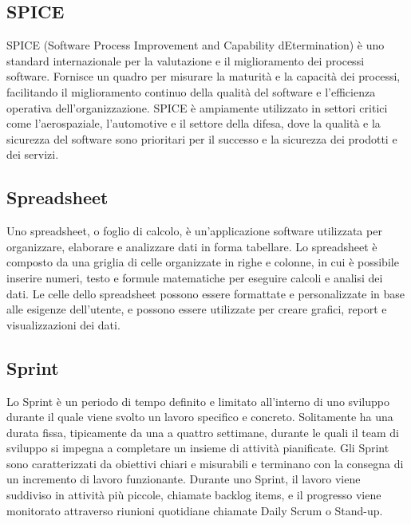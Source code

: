 \vspace{2em}
\subsection*{SPICE}
\par SPICE (Software Process Improvement and Capability dEtermination) è uno standard internazionale per la valutazione e il miglioramento dei processi software. Fornisce un quadro per misurare la maturità e la capacità dei processi, facilitando il miglioramento continuo della qualità del software e l'efficienza operativa dell'organizzazione. SPICE è ampiamente utilizzato in settori critici come l'aerospaziale, l'automotive e il settore della difesa, dove la qualità e la sicurezza del software sono prioritari per il successo e la sicurezza dei prodotti e dei servizi.

\vspace{2em}
\subsection*{Spreadsheet}
\par Uno spreadsheet, o foglio di calcolo, è un'applicazione software utilizzata per organizzare, elaborare e analizzare dati in forma tabellare. Lo spreadsheet è composto da una griglia di celle organizzate in righe e colonne, in cui è possibile inserire numeri, testo e formule matematiche per eseguire calcoli e analisi dei dati. Le celle dello spreadsheet possono essere formattate e personalizzate in base alle esigenze dell'utente, e possono essere utilizzate per creare grafici, report e visualizzazioni dei dati.

\vspace{2em}
\subsection*{Sprint}
\par Lo Sprint è un periodo di tempo definito e limitato all'interno di uno sviluppo  durante il quale viene svolto un lavoro specifico e concreto. Solitamente ha una durata fissa, tipicamente da una a quattro settimane, durante le quali il team di sviluppo si impegna a completare un insieme di attività pianificate. Gli Sprint sono caratterizzati da obiettivi chiari e misurabili e terminano con la consegna di un incremento di lavoro funzionante. Durante uno Sprint, il lavoro viene suddiviso in attività più piccole, chiamate backlog items, e il progresso viene monitorato attraverso riunioni quotidiane chiamate Daily Scrum o Stand-up.

